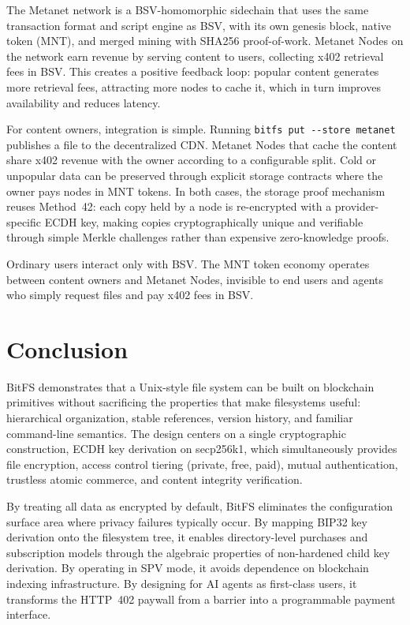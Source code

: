 \documentclass[11pt,a4paper]{article}
\begin{document}
The Metanet network is a BSV-homomorphic sidechain that uses the same transaction format and script engine as BSV, with its own genesis block, native token (MNT), and merged mining with SHA256 proof-of-work. Metanet Nodes on the network earn revenue by serving content to users, collecting x402 retrieval fees in BSV. This creates a positive feedback loop: popular content generates more retrieval fees, attracting more nodes to cache it, which in turn improves availability and reduces latency.

For content owners, integration is simple. Running \texttt{bitfs put -{}-store metanet} publishes a file to the decentralized CDN\@. Metanet Nodes that cache the content share x402 revenue with the owner according to a configurable split. Cold or unpopular data can be preserved through explicit storage contracts where the owner pays nodes in MNT tokens. In both cases, the storage proof mechanism reuses Method~42: each copy held by a node is re-encrypted with a provider-specific ECDH key, making copies cryptographically unique and verifiable through simple Merkle challenges rather than expensive zero-knowledge proofs.

Ordinary users interact only with BSV\@. The MNT token economy operates between content owners and Metanet Nodes, invisible to end users and agents who simply request files and pay x402 fees in BSV\@.

\section{Conclusion}

BitFS demonstrates that a Unix-style file system can be built on blockchain primitives without sacrificing the properties that make filesystems useful: hierarchical organization, stable references, version history, and familiar command-line semantics. The design centers on a single cryptographic construction, ECDH key derivation on secp256k1, which simultaneously provides file encryption, access control tiering (private, free, paid), mutual authentication, trustless atomic commerce, and content integrity verification.

By treating all data as encrypted by default, BitFS eliminates the configuration surface area where privacy failures typically occur. By mapping BIP32 key derivation onto the filesystem tree, it enables directory-level purchases and subscription models through the algebraic properties of non-hardened child key derivation. By operating in SPV mode, it avoids dependence on blockchain indexing infrastructure. By designing for AI agents as first-class users, it transforms the HTTP~402 paywall from a barrier into a programmable payment interface.
\end{document}
